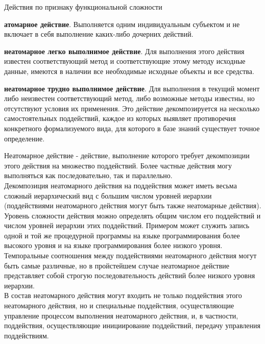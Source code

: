 \begin{frame}{\large Действия по признаку функциональной сложности}
\vspace{20}
    \begin{textitemize}
        \item \textbf{атомарное действие}. Выполняется одним индивидуальным субъектом и не включает в себя выполнение каких-либо дочерних действий.
        \item \textbf{неатомарное легко выполнимое действие}. Для выполнения этого действия известен соответствующий метод и соответствующие этому методу исходные данные, имеются в наличии все необходимые исходные объекты и все средства.
        \item \textbf{неатомарное трудно выполнимое действие}. Для выполнения в текущий момент либо неизвестен соответствующий метод, либо возможные методы известны, но отсутствуют условия их применения. Это действие декомпозируется на несколько самостоятельных поддействий, каждое из которых выявляет противоречия конкретного формализуемого вида, для которого в базе знаний существует точное определение. 
    \end{textitemize}
\end{frame}
\small{Неатомарное действие - действие, выполнение которого требует декомпозиции этого действия на множество поддействий. Более частные действия могу выполняться как последовательно, так и параллельно. \\
Декомпозиция неатомарного действия на поддействия может иметь весьма сложный иерархический вид с большим числом уровней иерархии (поддействиями неатомарного действия могут быть также неатомарные действия).\\
Уровень сложности действия можно определять общим числом его поддействий и числом уровней иерархии этих поддействий. Примером может служить запись одной и той же процедурной программы на языке программирования более высокого уровня и на языке программирования более низкого уровня.\\
Темпоральные соотношения между поддействиями неатомарного действия могут быть самые различные, но в пройстейшем случае неатомарное действие представляет собой строгую последовательность действий более низкого уровня иерархии.\\
В состав неатомарного действия могут входить не только поддействия этого неатомарного действия, но и специальные поддействия, осуществляющие управление процессом выполнения неатомарного действия, и, в частности, поддействия, осуществляющие инициирование поддействий, передачу управления поддействиям.}

